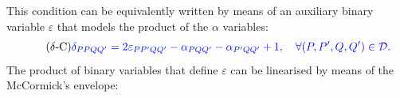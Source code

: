 \documentclass[a4paper,  review, authoryear, 1p.]{elsarticle}
\newcommand{\VB}{{V^{}_{\mathcal B}}}
\newcommand{\CV}[1]{{\color{blue}#1}}
\begin{document}
	This condition can be equivalently written by means of an auxiliary binary variable $\varepsilon$ that models the product of the $\alpha$ variables:
	\begin{equation*}\tag{$\delta$-C}\label{eq:deltaC}
		\CV{\deltamas{P}{P}{Q}{Q'}=2\varepsilonprod{P}{P'}{Q}{Q'} -\alphamas{P}{Q}{Q'}-\alphamas{P'}{Q}{Q'}+1,\quad\forall (P,P',Q,Q')\in\mathcal D.}
	\end{equation*}
	\CV{The product of binary variables that define $\varepsilon$ can be linearised by means of the McCormick's envelope}:
\end{document}
